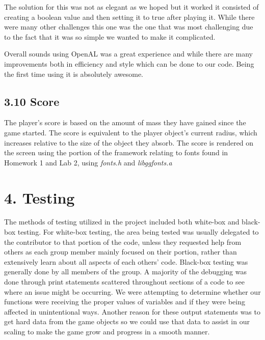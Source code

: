 \documentclass[12pt]{report}
\begin{document}
The solution for this was not as elegant as we hoped but it worked it consisted of creating a boolean value and then setting it to true after playing it. While there were many other challenges this one was the one that was most challenging due to the fact that it was so simple we wanted to make it complicated. \bigskip

Overall sounds using OpenAL was a great experience and while there are many improvements both in efficiency and style which can be done to our code. Being the first time using it is absolutely awesome. 


\newpage
\subsection*{3.10 Score}
The player's score is based on the amount of mass they have gained since the game started. The score is equivalent to the player object's current radius, which increases relative to the size of the object they absorb. The score is rendered on the screen using the portion of the framework relating to fonts found in Homework 1 and Lab 2, using \textit{fonts.h} and \textit{libggfonts.a} \bigskip

\newpage
\section*{4. Testing}

The methods of testing utilized in the project included both white-box and black-box testing. For white-box testing, the area being tested was usually delegated to the contributor to that portion of the code, unless they requested help from others as each group member mainly focused on their portion, rather than extensively learn about all aspects of each others' code. Black-box testing was generally done by all members of the group. A majority of the debugging was done through print statements scattered throughout sections of a code to see where an issue might be occurring. We were attempting to determine whether our functions were receiving the proper values of variables and if they were being affected in unintentional ways. Another reason for these output statements was to get hard data from the game objects so we could use that data to assist in our scaling to make the game grow and progress in a smooth manner. \bigskip
\end{document}
